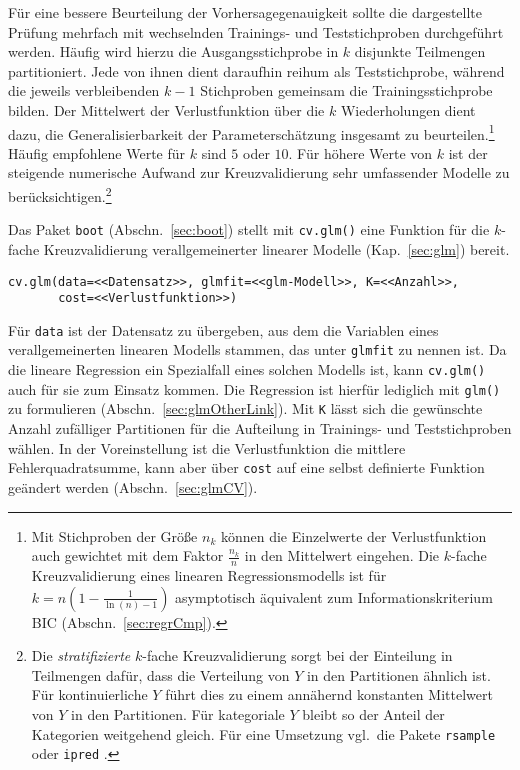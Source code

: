 Für eine bessere Beurteilung der Vorhersagegenauigkeit sollte die dargestellte Prüfung mehrfach mit wechselnden Trainings- und Teststichproben durchgeführt werden. Häufig wird hierzu die Ausgangsstichprobe in $k$ disjunkte Teilmengen partitioniert. Jede von ihnen dient daraufhin reihum als Teststichprobe, während die jeweils verbleibenden $k-1$ Stichproben gemeinsam die Trainingsstichprobe bilden. Der Mittelwert der Verlustfunktion über die $k$ Wiederholungen dient dazu, die Generalisierbarkeit der Parameterschätzung insgesamt zu beurteilen.\footnote{Mit Stichproben der Größe $n_{k}$ können die Einzelwerte der Verlustfunktion auch gewichtet mit dem Faktor $\frac{n_{k}}{n}$ in den Mittelwert eingehen. Die $k$-fache Kreuzvalidierung eines linearen Regressionsmodells ist für $k = n \left(1 - \frac{1}{\ln(n)-1}\right)$ asymptotisch äquivalent zum Informationskriterium BIC (Abschn.\ \ref{sec:regrCmp}).} Häufig empfohlene Werte für $k$ sind $5$ oder $10$. Für höhere Werte von $k$ ist der steigende numerische Aufwand zur Kreuzvalidierung sehr umfassender Modelle zu berücksichtigen.\footnote{Die \emph{stratifizierte} $k$-fache Kreuzvalidierung sorgt bei der Einteilung in Teilmengen dafür, dass die Verteilung von $Y$ in den Partitionen ähnlich ist. Für kontinuierliche $Y$ führt dies zu einem annähernd konstanten Mittelwert von $Y$ in den Partitionen. Für kategoriale $Y$ bleibt so der Anteil der Kategorien weitgehend gleich. Für eine Umsetzung vgl.\ die Pakete  \lstinline!rsample! oder  \lstinline!ipred! \cite{Peters2013}.}

Das Paket \lstinline!boot! (Abschn.\ \ref{sec:boot}) stellt mit \lstinline!cv.glm()! eine Funktion für die $k$-fache Kreuzvalidierung verallgemeinerter linearer Modelle (Kap.\ \ref{sec:glm}) bereit.
\begin{lstlisting}
cv.glm(data=<<Datensatz>>, glmfit=<<glm-Modell>>, K=<<Anzahl>>,
       cost=<<Verlustfunktion>>)
\end{lstlisting}

Für \lstinline!data! ist der Datensatz zu übergeben, aus dem die Variablen eines verallgemeinerten linearen Modells stammen, das unter \lstinline!glmfit! zu nennen ist. Da die lineare Regression ein Spezialfall eines solchen Modells ist, kann \lstinline!cv.glm()! auch für sie zum Einsatz kommen. Die Regression ist hierfür lediglich mit \lstinline!glm()! zu formulieren (Abschn.\ \ref{sec:glmOtherLink}). Mit \lstinline!K! lässt sich die gewünschte Anzahl zufälliger Partitionen für die Aufteilung in Trainings- und Teststichproben wählen. In der Voreinstellung ist die Verlustfunktion die mittlere Fehlerquadratsumme, kann aber über \lstinline!cost! auf eine selbst definierte Funktion geändert werden (Abschn.\ \ref{sec:glmCV}).

